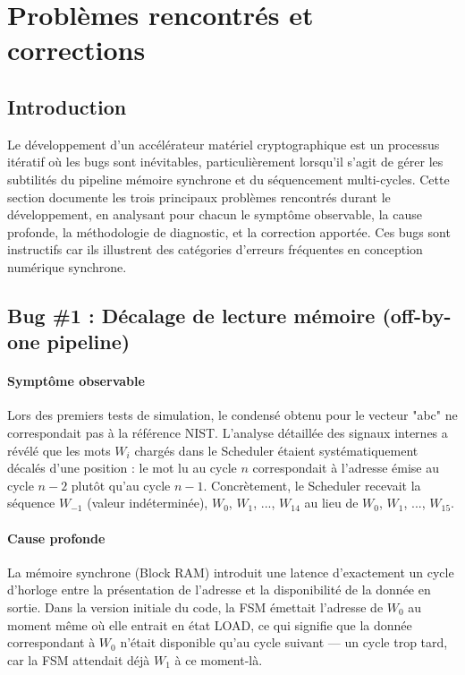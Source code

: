 \section{Problèmes rencontrés et corrections}
\label{sec:bugs}

\subsection{Introduction}

Le développement d'un accélérateur matériel cryptographique est un processus itératif où les bugs sont inévitables, particulièrement lorsqu'il s'agit de gérer les subtilités du pipeline mémoire synchrone et du séquencement multi-cycles. Cette section documente les trois principaux problèmes rencontrés durant le développement, en analysant pour chacun le symptôme observable, la cause profonde, la méthodologie de diagnostic, et la correction apportée. Ces bugs sont instructifs car ils illustrent des catégories d'erreurs fréquentes en conception numérique synchrone.

\subsection{Bug \#1 : Décalage de lecture mémoire (off-by-one pipeline)}

\paragraph{Symptôme observable} Lors des premiers tests de simulation, le condensé obtenu pour le vecteur "abc" ne correspondait pas à la référence NIST. L'analyse détaillée des signaux internes a révélé que les mots $W_i$ chargés dans le Scheduler étaient systématiquement décalés d'une position : le mot lu au cycle $n$ correspondait à l'adresse émise au cycle $n-2$ plutôt qu'au cycle $n-1$. Concrètement, le Scheduler recevait la séquence $W_{-1}$ (valeur indéterminée), $W_0$, $W_1$, ..., $W_{14}$ au lieu de $W_0$, $W_1$, ..., $W_{15}$.

\paragraph{Cause profonde} La mémoire synchrone (Block RAM) introduit une latence d'exactement un cycle d'horloge entre la présentation de l'adresse et la disponibilité de la donnée en sortie. Dans la version initiale du code, la FSM émettait l'adresse de $W_0$ au moment même où elle entrait en état LOAD, ce qui signifie que la donnée correspondant à $W_0$ n'était disponible qu'au cycle suivant --- un cycle trop tard, car la FSM attendait déjà $W_1$ à ce moment-là.

